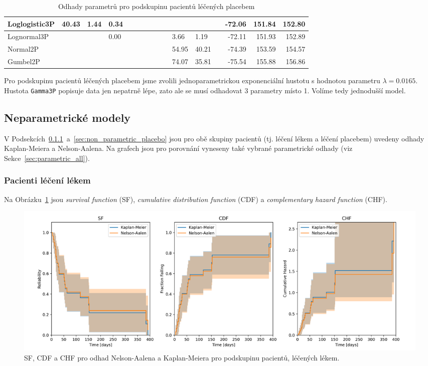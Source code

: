 \documentclass[a4, 11pt]{article}
\theoremstyle{definition}
\theoremstyle{remark}
\begin{document}
\begin{table}[H]
\begin{tabular}{|l|l|l|l|l|l|l|l|l|l|l|l|l|r|r|r|}
           Loglogistic3P  & 40.43  & 1.44 & 0.34 &       &      &        &       &      &      &       &       &      & -72.06 & 151.84 & 152.80 \\ \hline
           Lognormal3P    &        &      & 0.00 &       &      &        &       &      &      & 3.66  & 1.19  &      & -72.11 & 151.93 & 152.89 \\ \hline
           Normal2P       &        &      &      &       &      &        &       &      &      & 54.95 & 40.21 &      & -74.39 & 153.59 & 154.57 \\ \hline
           Gumbel2P       &        &      &      &       &      &        &       &      &      & 74.07 & 35.81 &      & -75.54 & 155.88 & 156.86 \\ \hline
       \end{tabular}
       \caption{Odhady parametrů pro podskupinu pacientů léčených placebem}
       \label{tab:fitall_output_parameters_tab_placebo}
       \normalsize
   \end{table}
    
    Pro podskupinu pacientů léčených placebem jsme zvolili jednoparametrickou exponenciální hustotu s hodnotou parametru $\lambda = 0.0165$. Hustota \texttt{Gamma3P} popisuje data jen nepatrně lépe, zato ale se musí odhadovat 3 parametry místo 1. Volíme tedy jednodušší model.
    
    
	
	\subsection{Neparametrické modely} \label{sec:non_parametric_all}
	V Podsekcích~\ref{sec:non_parametric_drugs}~a~\ref{sec:non_parametric_placebo} jsou pro obě skupiny pacientů (tj. léčení lékem a léčení placebem) uvedeny odhady Kaplan-Meiera a Nelson-Aalena.
	Na grafech jsou pro porovnání vyneseny také vybrané parametrické odhady (viz Sekce~\ref{sec:parametric_all}).
	
	\subsubsection{Pacienti léčení lékem} \label{sec:non_parametric_drugs}
	Na Obrázku~\ref{fig:four_men_drugs} jsou \textit{survival function} (SF), \textit{cumulative distribution function} (CDF) a \textit{complementary hazard function} (CHF).
    
	\begin{figure}[H]
		\centering
		\includegraphics[width=0.9\linewidth]{img/four_men_drugs.png}
		\caption{SF, CDF a CHF pro odhad Nelson-Aalena a Kaplan-Meiera pro podskupinu pacientů, léčených lékem.}
		\label{fig:four_men_drugs}
	\end{figure}
    
\end{document}

